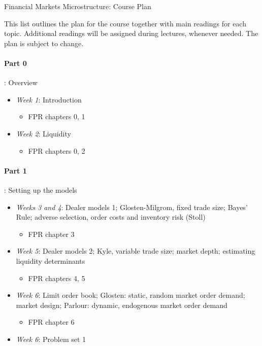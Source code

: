 \documentclass{article}
\begin{document}
\begin{center}
	{\huge Financial Markets Microstructure: Course Plan}
\end{center}
\bigskip

This list outlines the plan for the course together with main readings for each topic. Additional readings will be assigned during lectures, whenever needed. The plan is subject to change.
\medskip

\paragraph{Part 0}: Overview
\begin{itemize}
	\item \textit{Week 1}: Introduction
	\begin{itemize}
		\item FPR chapters 0, 1
	\end{itemize}
	\item \textit{Week 2}: Liquidity
	\begin{itemize}
		\item FPR chapters 0, 2
	\end{itemize}
\end{itemize}

\medskip 
\paragraph{Part 1}: Setting up the models
\begin{itemize}
	\item \textit{Weeks 3 and 4}: Dealer models 1; {Glosten-Milgrom}, fixed trade size; Bayes' Rule; adverse selection, order costs and inventory risk ({Stoll})
	\begin{itemize}
		\item FPR chapter 3
	\end{itemize}
	\item \textit{Week 5}: Dealer models 2; {Kyle}, variable trade size; market depth; estimating liquidity determinants
	\begin{itemize}
		\item FPR chapters 4, 5
	\end{itemize}
	\item \textit{Week 6}: Limit order book; {Glosten}: static, random market order demand; market design; {Parlour}: dynamic, endogenous market order demand
	\begin{itemize}
		\item FPR chapter 6
	\end{itemize}
	\item \textit{Week 6}: Problem set 1
\end{itemize}
\end{document}
